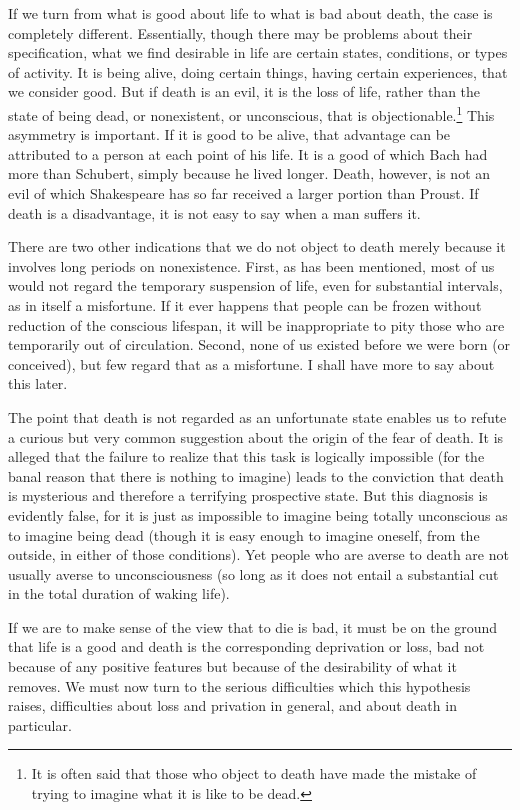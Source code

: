 If we turn from what is good about life to what is bad about death, the case is
completely different. Essentially, though there may be problems about their
specification, what we find desirable in life are certain states, conditions, or
types of activity. It is being alive, doing certain things, having certain
experiences, that we consider good. But if death is an evil, it is the loss of life,
rather than the state of being dead, or nonexistent, or unconscious, that is
objectionable.\footnote{It is often said that those who object to death have made the mistake of trying to
imagine what it is like to be dead.} This asymmetry is important. If it is good to be alive, that
advantage can be attributed to a person at each point of his life. It is a good of
which Bach had more than Schubert, simply because he lived longer. Death,
however, is not an evil of which Shakespeare has so far received a larger
portion than Proust. If death is a disadvantage, it is not easy to say when a man
suffers it.

There are two other indications that we do not object to death merely because
it involves long periods on nonexistence. First, as has been mentioned, most
of us would not regard the temporary suspension of life, even for substantial
intervals, as in itself a misfortune. If it ever happens that people can be frozen
without reduction of the conscious lifespan, it will be inappropriate to pity those
who are temporarily out of circulation. Second, none of us existed before we
were born (or conceived), but few regard that as a misfortune. I shall have more
to say about this later.

The point that death is not regarded as an unfortunate state enables us to refute
a curious but very common suggestion about the origin of the fear of death. It is alleged that the failure to realize that this task is logically impossible (for the banal reason that there is nothing to
imagine) leads to the conviction that death is mysterious and therefore a
terrifying prospective state. But this diagnosis is evidently false, for it is just as
impossible to imagine being totally unconscious as to imagine being dead
(though it is easy enough to imagine oneself, from the outside, in either of those
conditions). Yet people who are averse to death are not usually averse to
unconsciousness (so long as it does not entail a substantial cut in the total
duration of waking life).

If we are to make sense of the view that to die is bad, it must be on the ground
that life is a good and death is the corresponding deprivation or loss, bad not
because of any positive features but because of the desirability of what it
removes. We must now turn to the serious difficulties which this hypothesis
raises, difficulties about loss and privation in general, and about death in
particular.

